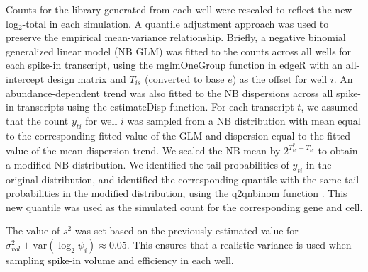 \documentclass{article}
\begin{document}
Counts for the library generated from each well were rescaled to reflect the new log$_2$-total in each simulation.
A quantile adjustment approach was used to preserve the empirical mean-variance relationship.
Briefly, a negative binomial generalized linear model (NB GLM) was fitted to the counts across all wells for each spike-in transcript, using the mglmOneGroup function in edgeR \cite{mccarthy2012differential, robinson2010edgeR} with an all-intercept design matrix and $T_{is}$ (converted to base $e$) as the offset for well $i$.
An abundance-dependent trend was also fitted to the NB dispersions across all spike-in transcripts using the estimateDisp function.
For each transcript $t$, we assumed that the count $y_{ti}$ for well $i$ was sampled from a NB distribution with mean equal to the corresponding fitted value of the GLM and dispersion equal to the fitted value of the mean-dispersion trend.
We scaled the NB mean by $2^{T^*_{is} - T_{is}}$ to obtain a modified NB distribution.
We identified the tail probabilities of $y_{ti}$ in the original distribution, and identified the corresponding quantile with the same tail probabilities in the modified distribution, using the q2qnbinom function \cite{robinson2008small}.
This new quantile was used as the simulated count for the corresponding gene and cell.



The value of $s^2$ was set based on the previously estimated value for $\sigma^2_{vol} + \mbox{var}(\log_2 \psi_{i}) \approx 0.05$.
This ensures that a realistic variance is used when sampling spike-in volume and efficiency in each well.
\end{document}
